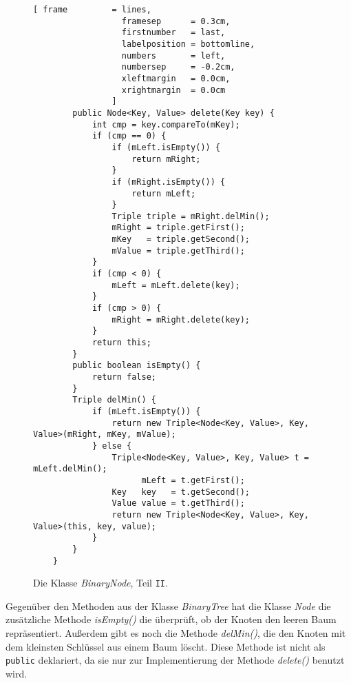 \begin{figure}[!ht]
  \centering
\begin{Verbatim}[ frame         = lines, 
                  framesep      = 0.3cm, 
                  firstnumber   = last,
                  labelposition = bottomline,
                  numbers       = left,
                  numbersep     = -0.2cm,
                  xleftmargin   = 0.0cm,
                  xrightmargin  = 0.0cm
                ]
        public Node<Key, Value> delete(Key key) {
            int cmp = key.compareTo(mKey);
            if (cmp == 0) {
                if (mLeft.isEmpty()) {
                    return mRight;
                } 
                if (mRight.isEmpty()) {
                    return mLeft;
                }
                Triple triple = mRight.delMin();
                mRight = triple.getFirst();
                mKey   = triple.getSecond();
                mValue = triple.getThird();
            }
            if (cmp < 0) {
                mLeft = mLeft.delete(key);
            }
            if (cmp > 0) {
                mRight = mRight.delete(key);
            }
            return this;
        }    
        public boolean isEmpty() {
            return false;
        }
        Triple delMin() {
            if (mLeft.isEmpty()) {
                return new Triple<Node<Key, Value>, Key, Value>(mRight, mKey, mValue);
            } else {
                Triple<Node<Key, Value>, Key, Value> t = mLeft.delMin();
                      mLeft = t.getFirst();
                Key   key   = t.getSecond();
                Value value = t.getThird();
                return new Triple<Node<Key, Value>, Key, Value>(this, key, value);
            }
        }        
    }
\end{Verbatim}
\vspace*{-0.3cm}
  \caption{Die Klasse \textsl{BinaryNode}, Teil \texttt{II}.}
  \label{fig:BinaryNode-II.java}
\end{figure}
\vspace*{0.1cm}

Gegen\"uber den Methoden aus der Klasse \textsl{BinaryTree} hat die Klasse \textsl{Node} die
zus\"atzliche Methode \textsl{isEmpty()} die \"uberpr\"uft, ob der Knoten den leeren Baum
repr\"asentiert. Au{\ss}erdem gibt es noch die Methode \textsl{delMin()}, die den Knoten mit dem
kleinsten Schl\"ussel aus einem Baum l\"oscht.  Diese Methode ist nicht als \texttt{public}
deklariert, da sie nur zur Implementierung der Methode \textsl{delete()} benutzt wird.


